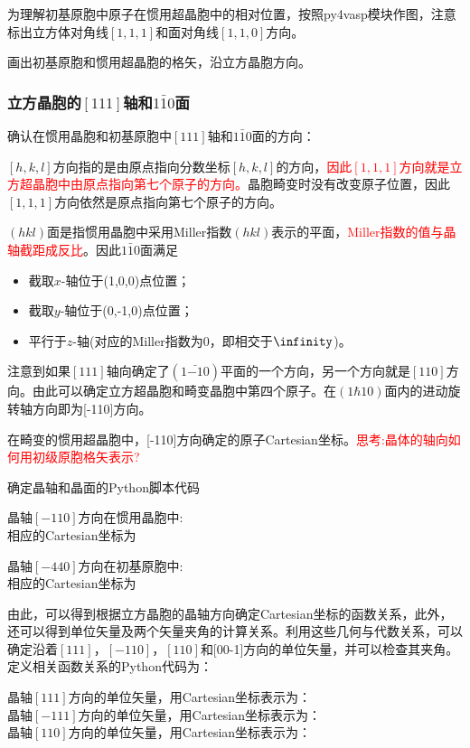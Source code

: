 为理解初基原胞中原子在惯用超晶胞中的相对位置，按照\textrm{py4vasp}模块作图，注意标出立方体对角线$[1,1,1]$和面对角线$[1,1,0]$方向。

画出初基原胞和惯用超晶胞的格矢，沿立方晶胞方向。

\subsubsection{立方晶胞的$[111]$轴和$1\bar{1}0$面}
确认在惯用晶胞和初基原胞中$[111]$轴和$1\bar{1}0$面的方向：

$[h,k,l]$方向指的是由原点指向分数坐标$[h,k,l]$的方向，\textcolor{red}{因此$[1,1,1]$方向就是立方超晶胞中由原点指向第七个原子的方向。}晶胞畸变时没有改变原子位置，因此$[1,1,1]$方向依然是原点指向第七个原子的方向。

$(hkl)$面是指惯用晶胞中采用\textrm{Miller}指数$(hkl)$表示的平面，\textcolor{red}{\textrm{Miller}指数的值与晶轴截距成反比}。因此$1\bar{1}0$面满足
\begin{itemize}
	\item 截取$x$-轴位于(1,0,0)点位置；
	\item 截取$y$-轴位于(0,-1,0)点位置；
	\item 平行于$z$-轴(对应的\textrm{Miller}指数为0，即相交于$\infinity$)。
\end{itemize}
注意到如果$[111]$轴向确定了$(1\bar{-1}0)$平面的一个方向，另一个方向就是$[110]$方向。由此可以确定立方超晶胞和畸变晶胞中第四个原子。在$(1\hbar{1}0)$面内的进动旋转轴方向即为[-110]方向。

在畸变的惯用超晶胞中，[-110]方向确定的原子\textrm{Cartesian}坐标。\textcolor{red}{思考:晶体的轴向如何用初级原胞格矢表示?}

确定晶轴和晶面的\textrm{Python}脚本代码

晶轴$[-110]$方向在惯用晶胞中:\\
相应的\textrm{Cartesian}坐标为

晶轴$[-440]$方向在初基原胞中:\\
相应的\textrm{Cartesian}坐标为

由此，可以得到根据立方晶胞的晶轴方向确定\textrm{Cartesian}坐标的函数关系，此外，还可以得到单位矢量及两个矢量夹角的计算关系。利用这些几何与代数关系，可以确定沿着$[111]$，$[-110]$，$[110]$和[00-1]方向的单位矢量，并可以检查其夹角。定义相关函数关系的\textrm{Python}代码为：

晶轴$[111]$方向的单位矢量，用\textrm{Cartesian}坐标表示为：\\
晶轴$[-111]$方向的单位矢量，用\textrm{Cartesian}坐标表示为：\\
晶轴$[110]$方向的单位矢量，用\textrm{Cartesian}坐标表示为：\\

